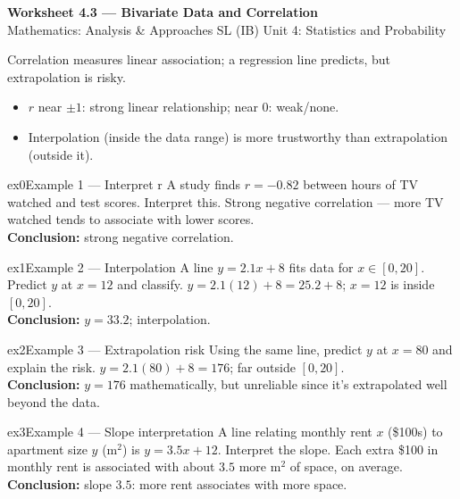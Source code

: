 \documentclass[11pt]{article}
\begin{document}
\begin{center}
{\LARGE\bfseries\color{titleblue}Worksheet 4.3 --- Bivariate Data and Correlation}\\[2pt]
{\small Mathematics: Analysis \& Approaches SL (IB) \textperiodcentered{} Unit 4: Statistics and Probability}
\end{center}

\begin{ideabox}
Correlation measures linear association; a regression line predicts, but extrapolation is risky.
\begin{itemize}[leftmargin=*,itemsep=2pt]
  \item $r$ near $\pm1$: strong linear relationship; near 0: weak/none.
  \item Interpolation (inside the data range) is more trustworthy than extrapolation (outside it).
\end{itemize}
\end{ideabox}


\begin{example}{ex0}{Example 1 --- Interpret r}
A study finds $r=-0.82$ between hours of TV watched and test scores. Interpret this.\soln
Strong negative correlation --- more TV watched tends to associate with lower scores.\\[3pt]\textbf{Conclusion:} strong negative correlation.
\end{example}

\begin{example}{ex1}{Example 2 --- Interpolation}
A line $y=2.1x+8$ fits data for $x\in[0,20]$. Predict $y$ at $x=12$ and classify.\soln
$y=2.1(12)+8=25.2+8$; $x=12$ is inside $[0,20]$.\\[3pt]\textbf{Conclusion:} $y=33.2$; interpolation.
\end{example}

\begin{example}{ex2}{Example 3 --- Extrapolation risk}
Using the same line, predict $y$ at $x=80$ and explain the risk.\soln
$y=2.1(80)+8=176$; far outside $[0,20]$.\\[3pt]\textbf{Conclusion:} $y=176$ mathematically, but unreliable since it's extrapolated well beyond the data.
\end{example}

\begin{example}{ex3}{Example 4 --- Slope interpretation}
A line relating monthly rent $x$ (\$100s) to apartment size $y$ (m$^2$) is $y=3.5x+12$. Interpret the slope.\soln
Each extra \$100 in monthly rent is associated with about $3.5$ more m$^2$ of space, on average.\\[3pt]\textbf{Conclusion:} slope $3.5$: more rent associates with more space.
\end{example}
\end{document}
